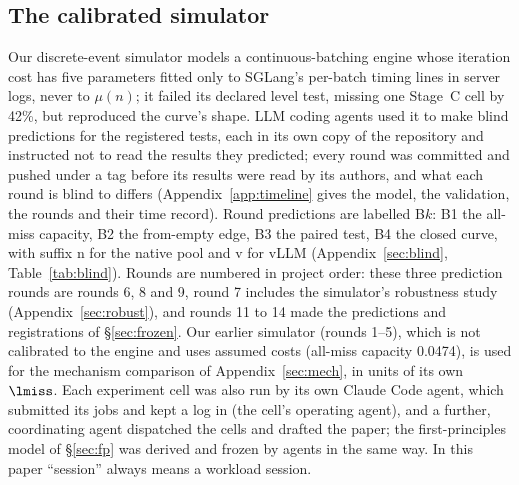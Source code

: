 \subsection{The calibrated simulator}\label{sec:sim}
Our discrete-event simulator models a continuous-batching engine whose iteration cost has five parameters fitted only to SGLang's per-batch timing lines in server logs, never to $\mu(n)$; it failed its declared level test, missing one Stage~C cell by 42\%, but reproduced the curve's shape. LLM coding agents used it to make blind predictions for the registered tests, each in its own copy of the repository and instructed not to read the results they predicted; every round was committed and pushed under a tag before its results were read by its authors, and what each round is blind to differs (Appendix~\ref{app:timeline} gives the model, the validation, the rounds and their time record). Round predictions are labelled B$k$: B1 the all-miss capacity, B2 the from-empty edge, B3 the paired test, B4 the closed curve, with suffix n for the native pool and v for vLLM (Appendix~\ref{sec:blind}, Table~\ref{tab:blind}). Rounds are numbered in project order: these three prediction rounds are rounds 6, 8 and 9, round 7 includes the simulator's robustness study (Appendix~\ref{sec:robust}), and rounds 11 to 14 made the predictions and registrations of \S\ref{sec:frozen}. Our earlier simulator (rounds 1--5), which is not calibrated to the engine and uses assumed costs (all-miss capacity 0.0474\sps), is used for the mechanism comparison of Appendix~\ref{sec:mech}, in units of its own $\lmiss$. Each experiment cell was also run by its own Claude Code agent, which submitted its jobs and kept a log in  (the cell's operating agent), and a further, coordinating agent dispatched the cells and drafted the paper; the first-principles model of \S\ref{sec:fp} was derived and frozen by agents in the same way. In this paper ``session'' always means a workload session.
